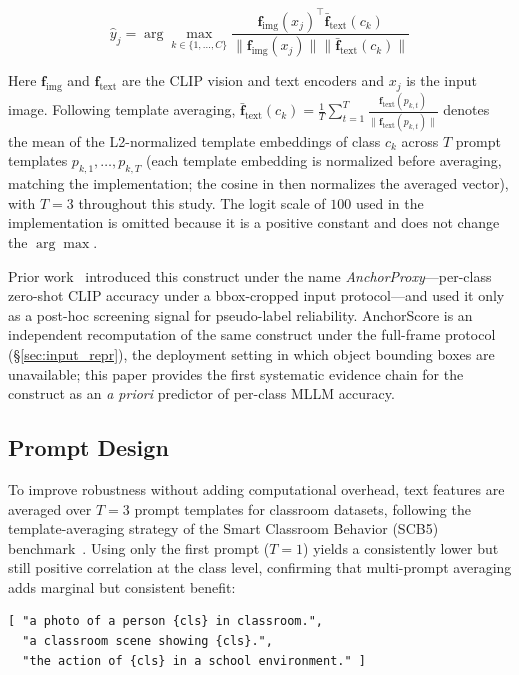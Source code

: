 \documentclass[a4paper,fleqn]{cas-sc}
\begin{document}
\begin{equation}
\hat{y}_j = \arg\max_{k \in \{1,\dots,C\}} \frac{\mathbf{f}_{\text{img}}(x_j)^\top \bar{\mathbf{f}}_{\text{text}}(c_k)}{\|\mathbf{f}_{\text{img}}(x_j)\| \|\bar{\mathbf{f}}_{\text{text}}(c_k)\|}
\label{eq:clip_pred}
\end{equation}

Here $\mathbf{f}_{\text{img}}$ and $\mathbf{f}_{\text{text}}$ are the CLIP vision and text encoders and $x_j$ is the input image. Following template averaging, $\bar{\mathbf{f}}_{\text{text}}(c_k) = \frac{1}{T}\sum_{t=1}^{T}\frac{\mathbf{f}_{\text{text}}(p_{k,t})}{\|\mathbf{f}_{\text{text}}(p_{k,t})\|}$ denotes the mean of the L2-normalized template embeddings of class $c_k$ across $T$ prompt templates $p_{k,1}, \dots, p_{k,T}$ (each template embedding is normalized before averaging, matching the implementation; the cosine in  then normalizes the averaged vector), with $T=3$ throughout this study. The logit scale of $100$ used in the implementation is omitted because it is a positive constant and does not change the $\arg\max$.

Prior work~\cite{ma2026agreement} introduced this construct under the name \emph{AnchorProxy}---per-class zero-shot CLIP accuracy under a bbox-cropped input protocol---and used it only as a post-hoc screening signal for pseudo-label reliability. AnchorScore is an independent recomputation of the same construct under the full-frame protocol (\S\ref{sec:input_repr}), the deployment setting in which object bounding boxes are unavailable; this paper provides the first systematic evidence chain for the construct as an \emph{a priori} predictor of per-class MLLM accuracy.

\subsection{Prompt Design}

To improve robustness without adding computational overhead, text features are averaged over $T=3$ prompt templates for classroom datasets, following the template-averaging strategy of the Smart Classroom Behavior (SCB5) benchmark~\cite{scb_dataset}. Using only the first prompt ($T=1$) yields a consistently lower but still positive correlation at the class level, confirming that multi-prompt averaging adds marginal but consistent benefit:

{\footnotesize
\begin{verbatim}
[ "a photo of a person {cls} in classroom.",
  "a classroom scene showing {cls}.",
  "the action of {cls} in a school environment." ]
\end{verbatim}}
\end{document}
